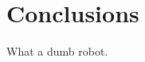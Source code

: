 \documentclass[a4paper,11pt]{article}
\begin{document}
\section{Conclusions}
What a dumb robot.








  
\end{document}
